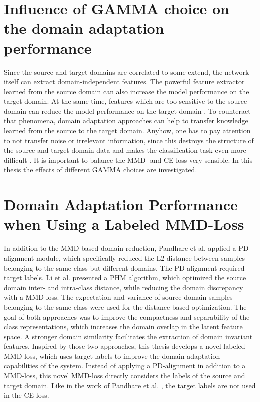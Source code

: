 \section{Influence of GAMMA choice on the domain adaptation performance}
Since the source and target domains are correlated to some extend, the network itself can extract domain-independent features. The powerful feature extractor learned from the source domain can also increase the model performance on the target domain. At the same time, features which are too sensitive to the source domain can reduce the model performance on the target domain \cite{li2020}. To counteract that phenomena, domain adaptation approaches can help to transfer knowledge learned from the source to the target domain. Anyhow, one has to pay attention to not transfer noise or irrelevant information, since this destroys the structure of the source and target domain data and makes the classification task even more difficult \cite{li2020}. It is important to balance the MMD- and CE-loss very sensible. In this thesis the effects of different GAMMA choices are investigated.

\section{Domain Adaptation Performance when Using a Labeled MMD-Loss}
In addition to the MMD-based domain reduction, Pandhare et al. \cite{Pandhare2021} applied a PD-alignment module, which specifically reduced the L2-distance between samples belonging to the same class but different domains. The PD-alignment required target labels. Li et al. \cite{Li2018} presented a PHM algorithm, which optimized the source domain inter- and intra-class distance, while reducing the domain discrepancy with a MMD-loss. The expectation and variance of source domain samples belonging to the same class were used for the distance-based optimization. The goal of both approaches was to improve the compactness and separability of the class representations, which increases the domain overlap in the latent feature space. A stronger domain similarity facilitates the extraction of domain invariant features. Inspired by those two approaches, this thesis develops a novel labeled MMD-loss, which uses target labels to improve the domain adaptation capabilities of the system. Instead of applying a PD-alignment in addition to a MMD-loss, this novel MMD-loss directly considers the labels of the source and target domain. Like in the work of Pandhare et al. \cite{Pandhare2021}, the target labels are not used in the CE-loss.

